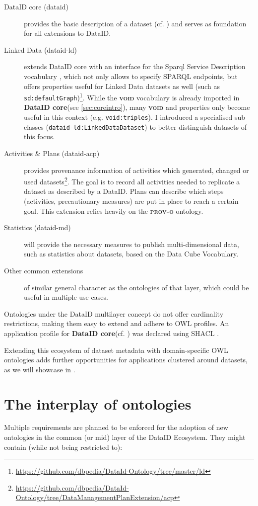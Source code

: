 \documentclass[a4paper,english,twoside,BCOR1.5cm,headsepline,DIV12,appendixprefix,final,12pt]{scrbook}
\newcommand{\core}{{\ttfamily\bfseries DataID core}\xspace}
\newcommand{\prov}{{\scshape\bfseries prov-o}\xspace}
\newcommand{\void}{{\scshape\bfseries void}\xspace}
\newcommand{\prop}[1]{{{\texttt{#1}}}}
\newcommand\footnoteurl[1]{\footnote{\scriptsize\url{#1}}}
\begin{document}
\begin{description}
\item[DataID core (dataid)] provides the basic description of a dataset (cf. ) and serves as foundation for all extensions to DataID.
\item[Linked Data (dataid-ld)] extends DataID core with an interface for the Sparql Service Description vocabulary \cite{sparqlsd}, which not only allows to specify SPARQL endpoints, but offers properties useful for Linked Data datasets as well (such as \prop{sd:defaultGraph})\footnoteurl{https://github.com/dbpedia/DataId-Ontology/tree/master/ld}. While the \void vocabulary is already imported in \core (see \cref{sec:coreintro}), many \void and properties only become useful in this context (e.g. \prop{void:triples}). I introduced a specialised sub classes (\prop{dataid-ld:LinkedDataDataset}) to better distinguish datasets of this focus. 
\item[Activities \& Plans (dataid-acp)] provides provenance information of activities which generated, changed or used datasets\footnoteurl{https://github.com/dbpedia/DataId-Ontology/tree/DataManagementPlanExtension/acp}. The goal is to record all activities needed to replicate a dataset as described by a DataID. Plans can describe which steps (activities, precautionary measures) are put in place to reach a certain goal. This extension relies heavily on the \prov ontology\cite{prov}.
\item[Statistics (dataid-md)] will provide the necessary measures to publish multi-dimensional data, such as statistics about datasets, based on the Data Cube Vocabulary\cite{datacube}. 
\item[Other common extensions] of similar general character as the ontologies of that layer, which could be useful in multiple use cases.
\end{description}

Ontologies under the DataID multilayer concept do not offer cardinality restrictions, making them easy to extend and adhere to OWL profiles. An application profile for \core (cf. ) was declared using SHACL \cite{shacl}.

Extending this ecosystem of dataset metadata with domain-specific OWL ontologies adds further opportunities for applications clustered around datasets, as we will showcase in .


\section{The interplay of ontologies} 
\label{sec:interplay}
Multiple requirements are planned to be enforced for the adoption of new ontologies in the common (or mid) layer of the DataID Ecosystem.
They might contain (while not being restricted to):
\end{document}
